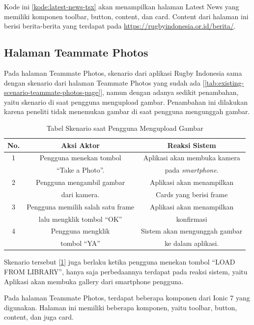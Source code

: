 Kode ini \ref{kode:latest-news-tsx} akan menampilkan halaman Latest News yang memiliki komponen toolbar, button, content, dan card. Content dari halaman ini berisi berita-berita yang terdapat pada \url{https://rugbyindonesia.or.id/berita/}.

\subsection{Halaman Teammate Photos}
Pada halaman Teammate Photos, skenario dari aplikasi Rugby Indonesia sama dengan skenario dari halaman Teammate Photos yang sudah ada [\ref{tab:existing-scenario-teammate-photos-page}], namun dengan adanya sedikit penambahan, yaitu skenario di saat pengguna mengupload gambar.
Penambahan ini dilakukan karena peneliti tidak menemukan gambar di saat pengguna mengunggah gambar.

\begin{table} [H]
    \centering
    \caption{Tabel Skenario saat Pengguna Mengupload Gambar}
    \begin{tabular}{|c|c|c|}
    \hline
       No. & Aksi Aktor & Reaksi Sistem  \\ \hline
        1 & Pengguna menekan tombol  & Aplikasi akan membuka kamera \\
         & ``Take a Photo''. & pada \textit{smartphone}. \\ \hline
        2 & Pengguna mengambil gambar & Aplikasi akan menampilkan \\ 
         & dari kamera. & Cards yang berisi frame \\ \hline
        3 & Pengguna memilih salah satu frame & Aplikasi akan menampilkan \\ 
         & lalu mengklik tombol ``OK'' & konfirmasi \\ \hline
        4 & Pengguna mengklik & Sistem akan mengunggah gambar \\ 
         & tombol ``YA'' & ke dalam aplikasi. \\ \hline
    \end{tabular}
    \label{tab:usulan-skenario-halaman-teammate-photos}
\end{table}

Skenario tersebut [\ref{tab:usulan-skenario-halaman-teammate-photos}] juga berlaku ketika pengguna menekan tombol ``LOAD FROM LIBRARY'', hanya saja perbedaannya terdapat pada reaksi sistem, yaitu Aplikasi akan membuka gallery dari smartphone pengguna.

Pada halaman Teammate Photos, terdapat beberapa komponen dari Ionic 7 yang digunakan. Halaman ini memiliki beberapa komponen, yaitu toolbar, button, content, dan juga card.

